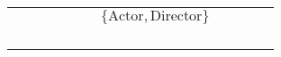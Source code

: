 \begin{table}[]
{\begin{tabular}{lllllllllll}
                          &                           &                   &                                                                          &                                                                        &                           & \cellcolor[HTML]{FC8D59}$\{\text{Actor}, \text{Director}\}$ &                                                                            &                                                                           &                                 &                                                                        \\
                          &                           &                   &                                                                          &                                                                        &                           &                                                             &                                                                            & \cellcolor[HTML]{FC8D59} &                                 &                                                                        \\
                          &                           &                   &                                                                          &                                                                        &                           &                                                             &                                                                            &                                                                           &                                 & \cellcolor[HTML]{FC8D59}  \\
                          &                           &                   & \cellcolor[HTML]{FC8D59} &                                                                        &                           &                                                             &                                                                            &                                                                           &                                 &                                                                        \\
                          &                           &                   &                                                                          & \cellcolor[HTML]{FC8D59}  &                           &                                                             &                                                                            &                                                                           &                                 &                                                                        \\

\end{tabular}}
\end{table}
